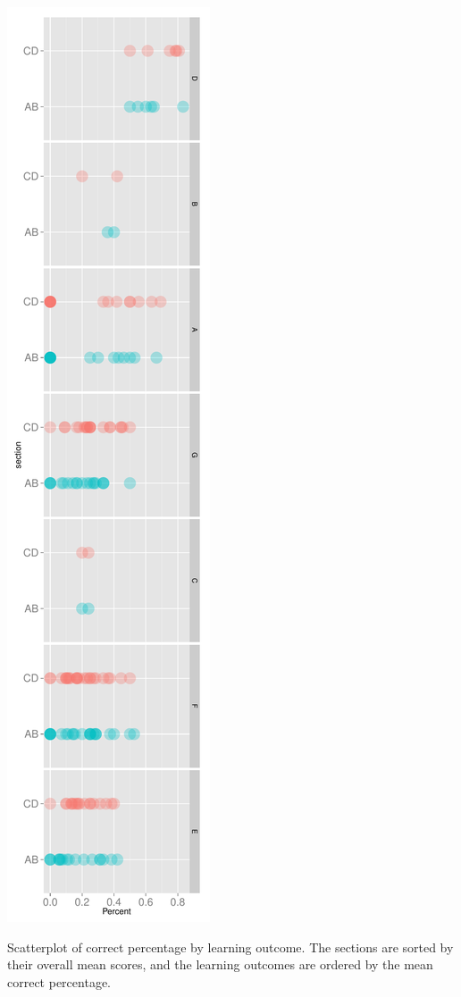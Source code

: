 \documentclass[12pt,nohyper]{tufte-handout}\usepackage[]{graphicx}\usepackage[]{color}
\begin{document}
\begin{marginfigure}\includegraphics[width=0.95\linewidth]{Topic06_Scatterplot_LOpct}
\caption{\label{mar:LOpct}Scatterplot of correct percentage by learning outcome. The sections are sorted by their overall mean scores, and the learning outcomes are ordered by the mean correct percentage.}\end{marginfigure}%
\end{document}
